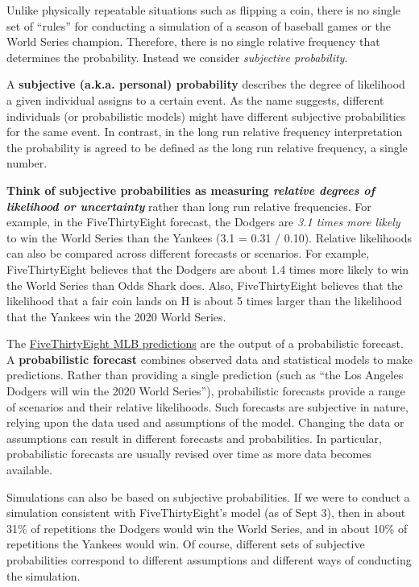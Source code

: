 \documentclass[
]{book}
\theoremstyle{definition}
\theoremstyle{definition}
\theoremstyle{definition}
\theoremstyle{remark}
\begin{document}
Unlike physically repeatable situations such as flipping a coin, there is no single set of ``rules'' for conducting a simulation of a season of baseball games or the World Series champion. Therefore, there is no single relative frequency that determines the probability. Instead we consider \emph{subjective probability}.

A \textbf{subjective (a.k.a. personal) probability} describes the degree of likelihood a given individual assigns to a certain event. As the name suggests, different individuals (or probabilistic models) might have different subjective probabilities for the same event. In contrast, in the long run relative frequency interpretation the probability is agreed to be defined as the long run relative frequency, a single number.

\textbf{Think of subjective probabilities as measuring \emph{relative degrees of likelihood or uncertainty} } rather than long run relative frequencies. For example, in the FiveThirtyEight forecast, the Dodgers are \emph{3.1 times more likely} to win the World Series than the Yankees (3.1 = 0.31 / 0.10). Relative likelihoods can also be compared across different forecasts or scenarios. For example, FiveThirtyEight believes that the Dodgers are about 1.4 times more likely to win the World Series than Odds Shark does. Also, FiveThirtyEight believes that the likelihood that a fair coin lands on H is about 5 times larger than the likelihood that the Yankees win the 2020 World Series.

The \href{https://fivethirtyeight.com/features/how-our-mlb-predictions-work/}{FiveThirtyEight MLB predictions} are the output of a probabilistic forecast. A \textbf{probabilistic forecast} combines observed data and statistical models to make predictions. Rather than providing a single prediction (such as ``the Los Angeles Dodgers will win the 2020 World Series''), probabilistic forecasts provide a range of scenarios and their relative likelihoods. Such forecasts are subjective in nature, relying upon the data used and assumptions of the model. Changing the data or assumptions can result in different forecasts and probabilities. In particular, probabilistic forecasts are usually revised over time as more data becomes available.

Simulations can also be based on subjective probabilities. If we were to conduct a simulation consistent with FiveThirtyEight's model (as of Sept 3), then in about 31\% of repetitions the Dodgers would win the World Series, and in about 10\% of repetitions the Yankees would win. Of course, different sets of subjective probabilities correspond to different assumptions and different ways of conducting the simulation.
\end{document}
